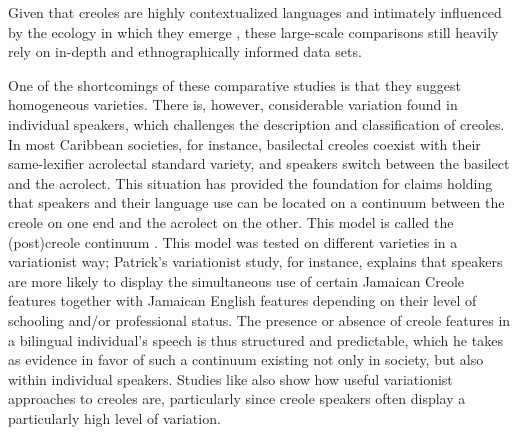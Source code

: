 \documentclass[output=paper]{langscibook}
\begin{document}
Given that creoles are highly contextualized languages and intimately influenced by the ecology in which they emerge \citep{jourdan2008cultural}, these large-scale comparisons still heavily rely on in-depth and ethnographically informed data sets.

One of the shortcomings of these comparative studies is that they suggest homogeneous varieties. There is, however, considerable variation found in individual speakers, which challenges the description and classification of creoles. In most Caribbean societies, for instance, basilectal creoles coexist with their same-lexifier acrolectal standard variety, and speakers switch between the basilect and the acrolect. This situation has provided the foundation for claims holding that speakers and their language use can be located on a continuum between the creole on one end and the acrolect on the other. This model is called the (post)creole continuum \citep[cf.][]{decamp1971toward}. This model was tested on different varieties in a variationist way; Patrick's \parencite*{patrick1999urban} variationist study, for instance, explains that speakers are more likely to display the simultaneous use of certain Jamaican Creole features together with Jamaican English features depending on their level of schooling and/or professional status. The presence or absence of creole features in a bilingual individual’s speech is thus structured and predictable, which he takes as evidence in favor of such a continuum existing not only in society, but also within individual speakers. Studies like \citet{patrick1999urban} also show how useful variationist approaches to creoles are, particularly since creole speakers often display a particularly high level of variation.
\end{document}

